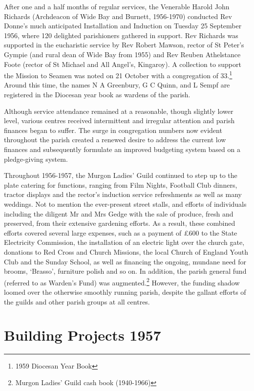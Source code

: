 After one and a half months of regular services, the Venerable Harold John Richards (Archdeacon of Wide Bay and Burnett, 1956-1970) conducted Rev Donne's much anticipated Installation and Induction on Tuesday 25 September 1956, where 120 delighted parishioners gathered in support. Rev Richards was supported in the eucharistic service by Rev Robert Mawson, rector of St Peter's Gympie (and rural dean of Wide Bay from 1955) and Rev Reuben Athelstance Foote (rector of St Michael and All Angel's, Kingaroy). A collection to support the Mission to Seamen was noted on 21 October with a congregation of 33.\footnote{1959 Diocesan Year Book} Around this time, the names N A Greenbury, G C Quinn, and L Sempf are registered in the Diocesan year book as wardens of the parish.


Although service attendance remained at a reasonable, though slightly lower level, various centres received intermittent and irregular attention and parish finances began to suffer. The surge in congregation numbers now evident throughout the parish created a renewed desire to address the current low finances and subsequently formulate an improved budgeting system based on a pledge-giving system.



Throughout 1956-1957, the Murgon Ladies' Guild continued to step up to the plate catering for functions, ranging from Film Nights, Football Club dinners, tractor displays and the rector's induction service refreshments as well as many weddings. Not to mention the ever-present street stalls, and efforts of individuals including the diligent Mr and Mrs Gedge with the sale of produce, fresh and preserved, from their extensive gardening efforts. As a result, these combined efforts covered several large expenses, such as a payment of \pounds600 to the State Electricity Commission, the installation of an electric light over the church gate, donations to Red Cross and Church Missions, the local Church of England Youth Club and the Sunday School, as well as financing the ongoing, mundane need for brooms, `Brasso', furniture polish and so on. In addition, the parish general fund (referred to as Warden's Fund) was augmented.\footnote{Murgon Ladies' Guild cash book (1940-1966)} However, the funding shadow loomed over the otherwise smoothly running parish, despite the gallant efforts of the guilds and other parish groups at all centres.


\section{Building Projects 1957}



